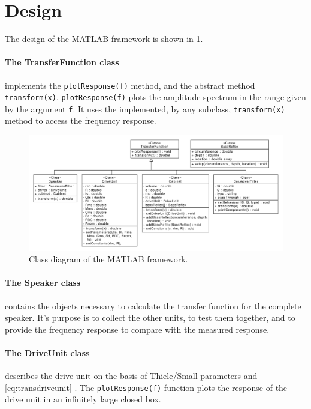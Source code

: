 \section{Design}
The design of the MATLAB framework is shown in \cref{fig:classbdd}.

\paragraph{The TransferFunction class} implements the \texttt{plotResponse(f)} method, and the  abstract method \texttt{transform(x)}.
\texttt{plotResponse(f)} plots the amplitude spectrum in the range given by the argument \texttt{f}.
It uses the implemented, by any subclass, \texttt{transform(x)} method to access the frequency response.

\begin{figure}
	\centering
	\includegraphics[width=\linewidth]{gfx/Design/Class_BDD}
	\caption{Class diagram of the MATLAB framework.}
	\label{fig:classbdd}
\end{figure}

\paragraph{The Speaker class} contains the objects necessary to calculate the transfer function for the complete speaker.
It's purpose is to collect the other units, to test them together, and to provide the frequency response to compare with the measured response.

\paragraph{The DriveUnit class} describes the drive unit on the basis of Thiele/Small parameters\cite{thielesmall} and \cref{eq:transdriveunit} \cite[p.~41]{Elektroakustik}.
The \texttt{plotResponse(f)} function plots the response of the drive unit in an infinitely large closed box.

